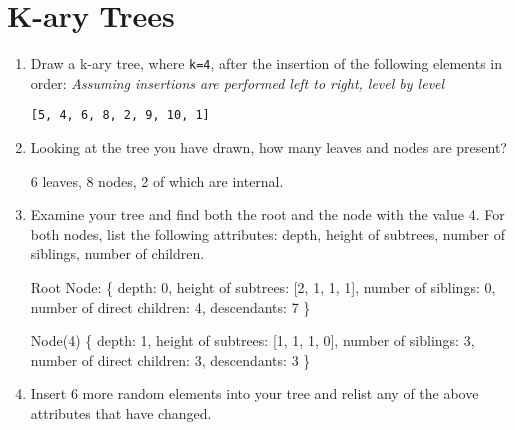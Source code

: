 \documentclass[11pt]{article}
\begin{document}
    \section{K-ary Trees}
    \begin{enumerate}
        \item Draw a k-ary tree, where \verb|k=4|, after the insertion of the following elements in order: \emph{Assuming insertions are performed left to right, level by level}
        
        \verb|[5, 4, 6, 8, 2, 9, 10, 1]|

        
        \item Looking at the tree you have drawn, how many leaves and nodes are present? 

        6 leaves, 8 nodes, 2 of which are internal.
        
        \item Examine your tree and find both the root and the node with the value 4. For both nodes, list the following attributes: depth, height of subtrees, number of siblings, number of children. 

        Root Node: \{ depth: 0, height of subtrees: [2, 1, 1, 1], number of siblings: 0, number of direct children: 4, descendants: 7 \}

        Node(4) \{ depth: 1, height of subtrees: [1, 1, 1, 0], number of siblings: 3, number of direct children: 3, descendants: 3 \}
        
        \item Insert 6 more random elements into your tree and relist any of the above attributes that have changed.



\end{enumerate}
\end{document}
